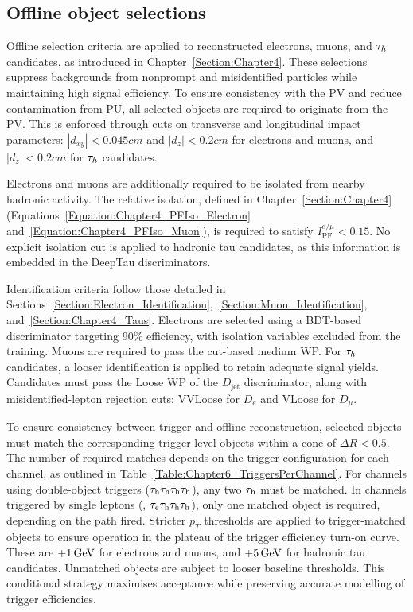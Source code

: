 \subsection{Offline object selections}
\label{Section:Chapter6_ObjectSelection}

Offline selection criteria are applied to reconstructed electrons, muons, and $\tau_h$candidates, as introduced in Chapter~\ref{Section:Chapter4}. These selections suppress backgrounds from nonprompt and misidentified particles while maintaining high signal efficiency. To ensure consistency with the \ac{PV} and reduce contamination from \ac{PU}, all selected objects are required to originate from the \ac{PV}. This is enforced through cuts on transverse and longitudinal impact parameters: $|d_{xy}| < 0.045\unit{cm}$ and $|d_z| < 0.2\unit{cm}$ for electrons and muons, and $|d_z| < 0.2\unit{cm}$ for $\tau_h$ candidates.

Electrons and muons are additionally required to be isolated from nearby hadronic activity. The relative isolation, defined in Chapter~\ref{Section:Chapter4} (Equations~\ref{Equation:Chapter4_PFIso_Electron} and~\ref{Equation:Chapter4_PFIso_Muon}), is required to satisfy $I^{e/\mu}_\text{PF} < 0.15$. No explicit isolation cut is applied to hadronic tau candidates, as this information is embedded in the DeepTau discriminators.

Identification criteria follow those detailed in Sections~\ref{Section:Electron_Identification},~\ref{Section:Muon_Identification}, and~\ref{Section:Chapter4_Taus}. Electrons are selected using a BDT-based discriminator targeting 90\% efficiency, with isolation variables excluded from the training. Muons are required to pass the cut-based medium \ac{WP}. For $\tau_h$ candidates, a looser identification is applied to retain adequate signal yields. Candidates must pass the Loose \ac{WP} of the $D_{\text{jet}}$ discriminator, along with misidentified-lepton rejection cuts: VVLoose for $D_e$ and VLoose for $D_\mu$. 

To ensure consistency between trigger and offline reconstruction, selected objects must match the corresponding trigger-level objects within a cone of $\Delta R < 0.5$. The number of required matches depends on the trigger configuration for each channel, as outlined in Table~\ref{Table:Chapter6_TriggersPerChannel}. For channels using double-object triggers (\eg $\tau_\mathrm{h}\tau_\mathrm{h}\tau_\mathrm{h}\tau_\mathrm{h}$), any two $\tau_\mathrm{h}$ must be matched. In channels triggered by single leptons (\eg, $\tau_e\tau_\mathrm{h}\tau_\mathrm{h}\tau_\mathrm{h}$), only one matched object is required, depending on the path fired. Stricter $p_T$ thresholds are applied to trigger-matched objects to ensure operation in the plateau of the trigger efficiency turn-on curve. These are $+1\,\text{Ge\hspace{-.08em}V}$ for electrons and muons, and $+5\,\text{Ge\hspace{-.08em}V}$ for hadronic tau candidates. Unmatched objects are subject to looser baseline thresholds. This conditional strategy maximises acceptance while preserving accurate modelling of trigger efficiencies.

